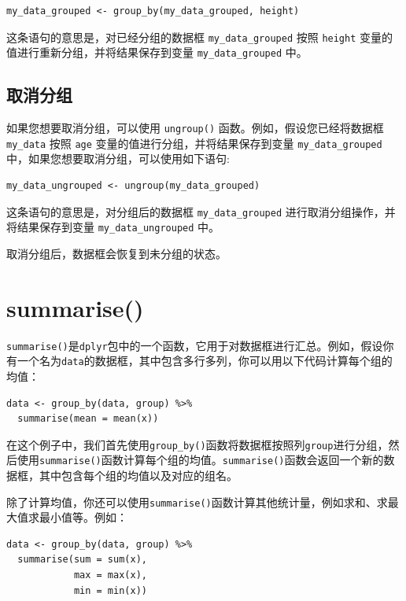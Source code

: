 \documentclass[
  letterpaper,
  DIV=11,
  numbers=noendperiod]{scrreprt}
\begin{document}
\begin{verbatim}
my_data_grouped <- group_by(my_data_grouped, height)
\end{verbatim}

这条语句的意思是，对已经分组的数据框 \texttt{my\_data\_grouped} 按照
\texttt{height} 变量的值进行重新分组，并将结果保存到变量
\texttt{my\_data\_grouped} 中。

\hypertarget{ux53d6ux6d88ux5206ux7ec4}{%
\subsection{取消分组}\label{ux53d6ux6d88ux5206ux7ec4}}

如果您想要取消分组，可以使用 \texttt{ungroup()}
函数。例如，假设您已经将数据框 \texttt{my\_data} 按照 \texttt{age}
变量的值进行分组，并将结果保存到变量 \texttt{my\_data\_grouped}
中，如果您想要取消分组，可以使用如下语句:

\begin{verbatim}
my_data_ungrouped <- ungroup(my_data_grouped)
\end{verbatim}

这条语句的意思是，对分组后的数据框 \texttt{my\_data\_grouped}
进行取消分组操作，并将结果保存到变量 \texttt{my\_data\_ungrouped} 中。

取消分组后，数据框会恢复到未分组的状态。

\hypertarget{summarise}{%
\section{summarise()}\label{summarise}}

\texttt{summarise()}是\texttt{dplyr}包中的一个函数，它用于对数据框进行汇总。例如，假设你有一个名为\texttt{data}的数据框，其中包含多行多列，你可以用以下代码计算每个组的均值：

\begin{verbatim}
data <- group_by(data, group) %>%
  summarise(mean = mean(x))
\end{verbatim}

在这个例子中，我们首先使用\texttt{group\_by()}函数将数据框按照列\texttt{group}进行分组，然后使用\texttt{summarise()}函数计算每个组的均值。\texttt{summarise()}函数会返回一个新的数据框，其中包含每个组的均值以及对应的组名。

除了计算均值，你还可以使用\texttt{summarise()}函数计算其他统计量，例如求和、求最大值求最小值等。例如：

\begin{verbatim}
data <- group_by(data, group) %>%
  summarise(sum = sum(x),
            max = max(x),
            min = min(x))
\end{verbatim}
\end{document}
